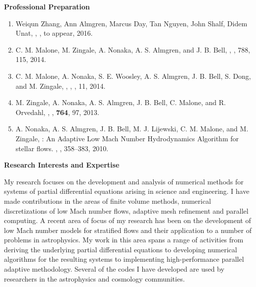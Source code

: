 \documentclass[11pt,letterpaper,english]{article}
\begin{document}
{\begin{flushleft} {\bf Professional Preparation}
\begin{enumerate}
\item Weiqun Zhang, Ann Almgren, Marcus Day, Tan Nguyen, John Shalf, Didem Unat, 
, , to appear, 2016. \\

\item C. M. Malone, M. Zingale, A. Nonaka, A. S. Almgren, and J. B. Bell, 
,
, 788, 115, 2014. \\ 

\item C. M. Malone, A. Nonaka, S. E. Woosley, A. S. Almgren, J. B. Bell, S. Dong, and M. Zingale, 
,
, , 11, 2014.  \\ 

\item M. Zingale, A. Nonaka, A. S. Almgren, J. B. Bell, C. Malone, and R. Orvedahl, 
, 
, 
{\bf 764}, 97, 2013. \\ 
\item A. Nonaka, A. S. Almgren, J. B. Bell, M. J. Lijewski, C. M. Malone, and M. Zingale,
: An Adaptive Low Mach Number Hydrodynamics Algorithm for
  stellar flows.
, 
, 358--383, 2010. \\ 
\end{enumerate} 

\vspace{-6pt}
{\bf Research Interests and Expertise}
{\parindent 12pt

My research focuses on the development and analysis of numerical methods for systems of partial 
differential equations arising in science and engineering.  I have made contributions in the
areas of finite volume methods, numerical discretizations of low Mach number flows, adaptive
mesh refinement and parallel computing.  A recent area of focus of my research has been on the
development of low Mach number models for stratified flows and their application to a number
of problems in astrophysics.  My work in this area spans a range of activities from deriving the
underlying partial differential equations to developing numerical algorithms for the resulting
systems to implementing high-performance parallel adaptive methodology.  
Several of the codes I have developed are used by researchers in the
astrophysics and cosmology communities.
}


\end{flushleft}}
\end{document}
